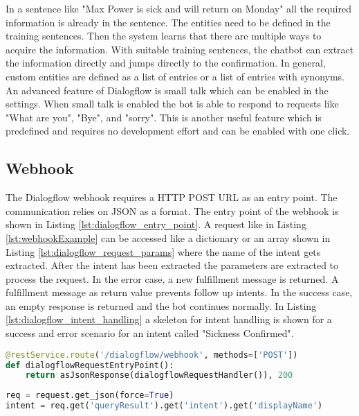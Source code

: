 In a sentence like "Max Power is sick and will return on Monday" all the required information is 
already in the sentence. 
The entities need to be defined in the training sentences.
Then the system learns that there are multiple ways to acquire the information.
With suitable training sentences, the chatbot can extract the information directly and jumps directly to the confirmation.  
In general, custom entities are defined as a list of entries or a list of entries with 
synonyms.
An advanced feature of Dialogflow is small talk which can be enabled in the settings.
When small talk is enabled the bot is able to respond to requests like "What are you",
"Bye", and "sorry".
This is another useful feature which is predefined and requires no development effort
and can be enabled with one click. 

\subsection{Webhook}
The Dialogflow webhook requires a HTTP POST URL as an entry point.
The communication relies on JSON as a format.
The entry point of the webhook is shown in Listing \ref{lst:dialogflow_entry_point}.
A request like in Listing \ref{lst:webhookExample} can be accessed like a dictionary or 
an array shown in Listing \ref{lst:dialogflow_request_params} where the name of the 
intent gets extracted. 
After the intent has been extracted the parameters are extracted to process the request.
In the error case, a new fulfillment message is returned.
A fulfillment message as return value prevents follow up intents.
In the success case, an empty response is returned and the bot continues normally.
In Listing \ref{lst:dialogflow_intent_handling} a skeleton for intent handling
is shown for a success and error scenario for an intent called "Sickness Confirmed".

\begin{lstlisting}[caption={Dialogflow Webhook Entry Point}, label={lst:dialogflow_entry_point},captionpos=b,frame=single,language={Python},commentstyle=\color{mygreen},keywordstyle=\color{blue},
    morekeywords={}]                
@restService.route('/dialogflow/webhook', methods=['POST'])
def dialogflowRequestEntryPoint():
    return asJsonResponse(dialogflowRequestHandler()), 200
\end{lstlisting}  

\begin{lstlisting}[caption={Dialogflow Request Parameters}, label={lst:dialogflow_request_params},captionpos=b,frame=single,language={Python},commentstyle=\color{mygreen},keywordstyle=\color{blue},
    morekeywords={}]                
req = request.get_json(force=True)
intent = req.get('queryResult').get('intent').get('displayName')
\end{lstlisting}  

